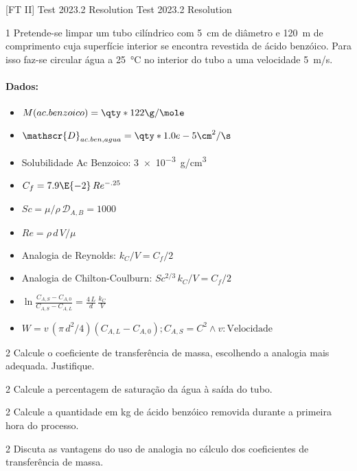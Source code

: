 \documentclass[\mainfilename]{subfiles}
\begin{document}

[FT II]
{Test 2023.2 Resolution} %
{Test 2023.2 Resolution} %

\begin{questionBox}1{ %
    Pretende-se limpar um tubo cilíndrico com \qty*{5}{\cm} de diâmetro e \qty*{120}{\m} de comprimento cuja superfície interior se encontra revestida de ácido benzóico. Para isso faz-se circular água a \qty*{25}{\celsius} no interior do tubo a uma velocidade \qty*{5}{\m/\s}.
} %
    \paragraph*{Dados:}
    \begin{itemize}
        \item \(M(ac. benzoico) = \qty*{122}{\g/\mole}\)
        \item \(\mathscr{D}_{ac.ben,agua}=\qty*{1.0e-5}{\cm^2/\s}\)
        \item Solubilidade Ac Benzoico: \qty*{3e-3}{\g/\cm^3}
        \item \(C_f=7.9\E{-2}\,Re^{-.25}\)
        \item \(Sc=\mu/\rho\,\mathscr{D}_{A,B}=1000\)
        \item \(Re=\rho\,d\,V/\mu\)
        \item Analogia de Reynolds: \(k_C/V=C_f/2\)
        \item Analogia de Chilton-Coulburn: \(Sc^{2/3}\,k_C/V=C_f/2\)
        \item \(
            \ln{\frac
                {C_{A,S}-C_{A,0}}
                {C_{A,S}-C_{A,L}}
            }
            = \frac{4\,L}{d}
            \,\frac{k_C}{V}
        \)
        \item \(W=v\,(\pi\,d^2/4)(C_{A,L}-C_{A,0}); C_{A,S}=C^2\land v:\text{Velocidade}\)
    \end{itemize}
\end{questionBox}

\begin{questionBox}2{ %
    Calcule o coeficiente de transferência de massa, escolhendo a analogia mais adequada. Justifique.
} %
\end{questionBox}

\begin{questionBox}2{ %
    Calcule a percentagem de saturação da água à saída do tubo.
} %
\end{questionBox}

\begin{questionBox}2{ %
    Calcule a quantidade em kg de ácido benzóico removida durante a primeira hora do processo.
} %
\end{questionBox}

\begin{questionBox}2{ %
    Discuta as vantagens do uso de analogia no cálculo dos coeficientes de transferência de massa.
} %
\end{questionBox}
\end{document}
